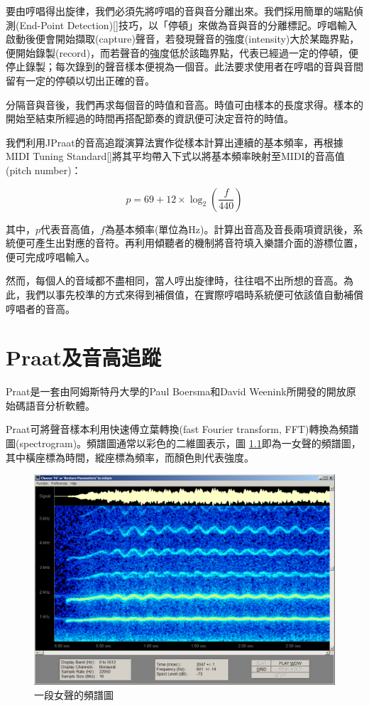 \documentclass[12pt,a4paper,oneside]{report}
\begin{document}
要由哼唱得出旋律，我們必須先將哼唱的音與音分離出來。我們採用簡單的端點偵測(End-Point Detection)[]技巧，以「停頓」來做為音與音的分離標記。哼唱輸入啟動後便會開始擷取(capture)聲音，若發現聲音的強度(intensity)大於某臨界點，便開始錄製(record)，而若聲音的強度低於該臨界點，代表已經過一定的停頓，便停止錄製；每次錄到的聲音樣本便視為一個音。此法要求使用者在哼唱的音與音間留有一定的停頓以切出正確的音。

分隔音與音後，我們再求每個音的時值和音高。時值可由樣本的長度求得。樣本的開始至結束所經過的時間再搭配節奏的資訊便可決定音符的時值。

我們利用JPraat的音高追蹤演算法實作從樣本計算出連續的基本頻率，再根據MIDI Tuning Standard[]將其平均帶入下式以將基本頻率映射至MIDI的音高值(pitch number)：

\[
p=69+12\times\log_2{\left(\frac{f}{440}\right)}
\]

其中，\(p\)代表音高值，\(f\)為基本頻率(單位為Hz)。計算出音高及音長兩項資訊後，系統便可產生出對應的音符。再利用傾聽者的機制將音符填入樂譜介面的游標位置，便可完成哼唱輸入。

然而，每個人的音域都不盡相同，當人哼出旋律時，往往唱不出所想的音高。為此，我們以事先校準的方式來得到補償值，在實際哼唱時系統便可依該值自動補償哼唱者的音高。
\chapter{Praat及音高追蹤}

Praat是一套由阿姆斯特丹大學的Paul Boersma和David Weenink所開發的開放原始碼語音分析軟體。

Praat可將聲音樣本利用快速傅立葉轉換(fast Fourier transform, FFT)轉換為頻譜圖(spectrogram)。頻譜圖通常以彩色的二維圖表示，圖 \ref{fig:spectrogram}即為一女聲的頻譜圖，其中橫座標為時間，縱座標為頻率，而顏色則代表強度。

\begin{figure}[htb]
\centering
\includegraphics[scale=0.3]{img/spectrogram.png}
\caption{ 一段女聲的頻譜圖 }
\label{fig:spectrogram}
\end{figure}
\end{document}
